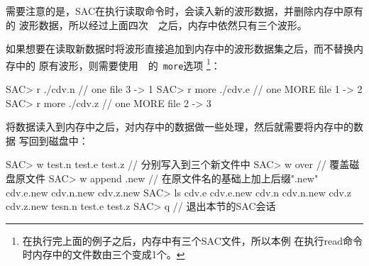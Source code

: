 需要注意的是，SAC在执行读取命令时，会读入新的波形数据，并删除内存中原有的
波形数据，所以经过上面四次~~之后，内存中依然只有三个波形。

如果想要在读取新数据时将波形直接追加到内存中的波形数据集之后，而不替换内存中的
原有波形，则需要使用~~的~\verb+more+选项
\footnote{在执行完上面的例子之后，内存中有三个SAC文件，所以本例
在执行read命令时内存中的文件数由三个变成1个。}：
\begin{SACCode}
SAC> r ./cdv.n              // one file       3 -> 1
SAC> r more ./cdv.e         // one MORE file  1 -> 2
SAC> r more ./cdv.z         // one MORE file  2 -> 3
\end{SACCode}

将数据读入到内存中之后，对内存中的数据做一些处理，然后就需要将内存中的数据
写回到磁盘中：
\begin{SACCode}
SAC> w test.n test.e test.z        // 分别写入到三个新文件中
SAC> w over                        // 覆盖磁盘原文件
SAC> w append .new                 // 在原文件名的基础上加上后缀".new"
cdv.e.new cdv.n.new cdv.z.new
SAC> ls
cdv.e cdv.e.new cdv.n cdv.n.new cdv.z cdv.z.new tesn.n test.e test.z
SAC> q                             // 退出本节的SAC会话
\end{SACCode}
